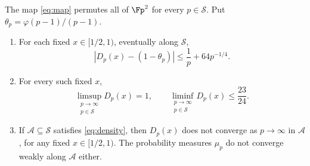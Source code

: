 \begin{theorem}\label{thm:main}
The map \eqref{eq:map} permutes all of $\Fp^2$ for every $p\in\mathcal S$.
Put $\theta_p=\varphi(p-1)/(p-1)$.
\par
\begin{enumerate}
\item For each fixed $x\in[1/2,1)$, eventually along $\mathcal S$,
\begin{equation}\label{eq:error}
 \left|D_p(x)-(1-\theta_p)\right|
       \le \frac1p+64p^{-1/4}.
\end{equation}
\item For every such fixed $x$,
\begin{equation}\label{eq:gap}
 \limsup_{\substack{p\to\infty\\p\in\mathcal S}}D_p(x)=1,
 \qquad
 \liminf_{\substack{p\to\infty\\p\in\mathcal S}}D_p(x)\le\frac{23}{24}.
\end{equation}
\item If $\mathcal A\subseteq\mathcal S$ satisfies \eqref{eq:density},
then $D_p(x)$ does not converge as $p\to\infty$ in $\mathcal A$, for any
fixed $x\in[1/2,1)$. The probability measures $\mu_p$ do not converge
weakly along $\mathcal A$ either.
\end{enumerate}
\end{theorem}
